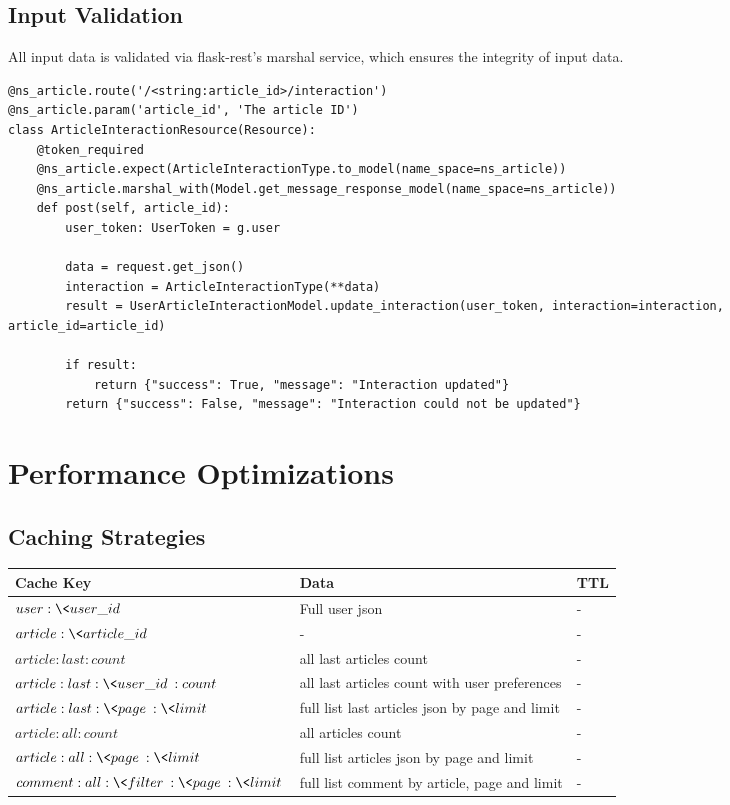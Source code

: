 \subsection{Input Validation}\label{subsec:input-validation}

All input data is validated via flask-rest's marshal service, which ensures the integrity of input data.

\begin{lstlisting}[style=pythonstyle,label={lst:input-validation-with-marshal},caption={Input validation with marshal}]
@ns_article.route('/<string:article_id>/interaction')
@ns_article.param('article_id', 'The article ID')
class ArticleInteractionResource(Resource):
    @token_required
    @ns_article.expect(ArticleInteractionType.to_model(name_space=ns_article))
    @ns_article.marshal_with(Model.get_message_response_model(name_space=ns_article))
    def post(self, article_id):
        user_token: UserToken = g.user

        data = request.get_json()
        interaction = ArticleInteractionType(**data)
        result = UserArticleInteractionModel.update_interaction(user_token, interaction=interaction, article_id=article_id)

        if result:
            return {"success": True, "message": "Interaction updated"}
        return {"success": False, "message": "Interaction could not be updated"}
\end{lstlisting}


\section{Performance Optimizations}\label{sec:performance-optimizations}

\subsection{Caching Strategies}\label{subsec:caching-strategies}

\begin{tabularx}{\textwidth}{lXl}
  \toprule
  Cache Key & Data & TTL \\
  \midrule
  $user:\<user\_id\>$ & Full user json & - \\
  $article:\<article\_id\>$ & - & - \\
  $article:last:count$ & all last articles count & - \\
  $article:last:\<user\_id\>:count$ & all last articles count with user preferences & - \\
  $article:last:\<page\>:\<limit\>$ & full list last articles json by page and limit & - \\
  $article:all:count$ & all articles count & - \\
  $article:all:\<page\>:\<limit\>$ & full list articles json by page and limit & - \\
  $comment:all:\<filter\>:\<page\>:\<limit\>$ & full list comment by article, page and limit  & - \\
  \bottomrule
\end{tabularx}

